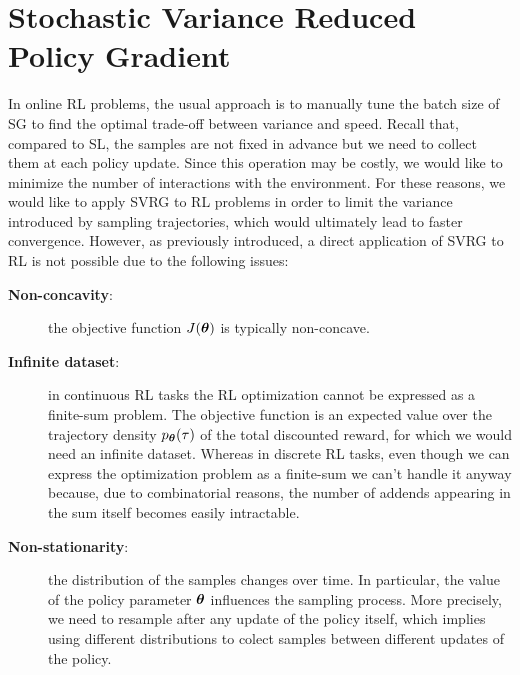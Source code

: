 \chapter{Stochastic Variance Reduced Policy Gradient} \label{chap:algorithm}
\vspace{-0.05in}
In online \acs{RL} problems, the usual approach is to manually tune the batch size of \acs{SG} to find the optimal trade-off between variance and speed.
Recall that, compared to \acs{SL}, the samples are not fixed in advance but we need to collect them at each policy update.
Since this operation may be costly, we would like to minimize the number of interactions with the environment.
For these reasons, we would like to apply \acs{SVRG} to \acs{RL} problems in order to limit the variance introduced by sampling trajectories, which would ultimately lead to faster convergence.
However, as previously introduced, a direct application of \acs{SVRG} to \acs{RL} is not possible due to the following issues:
\begin{description}
	\item[\textbf{\MakeUppercase{N}on-concavity}:] the objective function $J(\boldsymbol{\theta})$ is typically non-concave.
	\item[\textbf{\MakeUppercase{I}nfinite dataset}:] in continuous \acs{RL} tasks the \acs{RL} optimization cannot be expressed as a finite-sum problem. The objective function is an expected value over the trajectory density $p_{\boldsymbol{\theta}}(\tau)$ of the total discounted reward, for which we would need an infinite dataset. Whereas in discrete \acs{RL} tasks, even though we can express the optimization problem as a finite-sum we can't handle it anyway because, due to combinatorial reasons, the number of addends appearing in the sum itself becomes easily intractable.
	\item[\textbf{\MakeUppercase{N}on-stationarity}:] the distribution of the samples changes over time. In particular, the value of the policy parameter $\boldsymbol{\theta}$ influences the sampling process. More precisely, we need to resample after any update of the policy itself, which implies using different distributions to colect samples between different updates of the policy.
\end{description}
